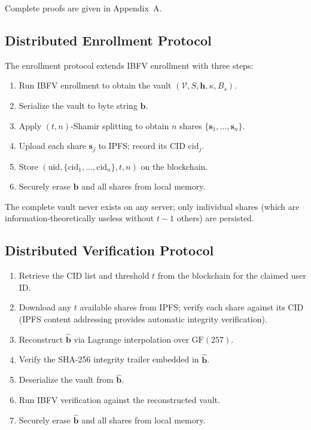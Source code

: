 Complete proofs are given in Appendix~A.

\subsection{Distributed Enrollment Protocol}
\label{sec:dist_enroll}

The enrollment protocol extends IBFV enrollment with three steps:

\begin{enumerate}
  \item Run IBFV enrollment to obtain the vault $(\mathcal{V}, S, \mathbf{h},
  \kappa, B_s)$.
  \item Serialize the vault to byte string $\mathbf{b}$.
  \item Apply $(t,n)$-Shamir splitting to obtain $n$ shares
  $\{\mathbf{s}_1, \ldots, \mathbf{s}_n\}$.
  \item Upload each share $\mathbf{s}_j$ to IPFS; record its CID $\mathrm{cid}_j$.
  \item Store $(\mathrm{uid}, \{\mathrm{cid}_1, \ldots, \mathrm{cid}_n\}, t, n)$
  on the blockchain.
  \item Securely erase $\mathbf{b}$ and all shares from local memory.
\end{enumerate}

The complete vault never exists on any server; only individual shares (which are
information-theoretically useless without $t{-}1$ others) are persisted.

\subsection{Distributed Verification Protocol}
\label{sec:dist_verify}

\begin{enumerate}
  \item Retrieve the CID list and threshold $t$ from the blockchain for the
  claimed user ID.
  \item Download any $t$ available shares from IPFS; verify each share against
  its CID (IPFS content addressing provides automatic integrity verification).
  \item Reconstruct $\hat{\mathbf{b}}$ via Lagrange interpolation over
  $\mathrm{GF}(257)$.
  \item Verify the SHA-256 integrity trailer embedded in $\hat{\mathbf{b}}$.
  \item Deserialize the vault from $\hat{\mathbf{b}}$.
  \item Run IBFV verification against the reconstructed vault.
  \item Securely erase $\hat{\mathbf{b}}$ and all shares from local memory.
\end{enumerate}

